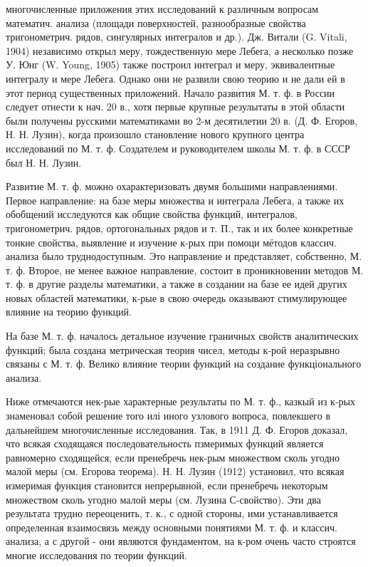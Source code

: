 \documentclass[10pt]{article}
\begin{document}
многочисленные приложения этих исследований к различным вопросам математич. анализа (площади поверхностей, разнообразные свойства тригонометрич. рядов, сингулярных интегралов и др.). Дж. Витали (G. Vitali, 1904) независимо открыл меру, тождественную мере Лебега, а несколько позже У. Юнг (W. Young, 1905) также построил интеграл и меру, эквивалентные интегралу и мере Лебега. Однако они не развили свою теорию и не дали ей в этот период существенных приложений. Начало развития М. т. ф. в России следует отнести к нач. 20 в., хотя первые крупные резулытаты в этой области были получены русскими математиками во 2-м десятилетии 20 в. (Д. Ф. Егоров, Н. Н. Лузин), когда произошло становление нового крупного центра исследований по М. т. ф. Создателем и руководителем школы М. т. ф. в СССР был Н. Н. Лузин.



Развитие М. т. ф. можно охарактеризовать двумя большими направлениями. Первое направление: на базе меры множества и интеграла Лебега, а также их обобщений исследуются как общие свойства функций, интегралов, тригонометрич. рядов, ортогональных рядов и т. П., так и их более конкретные тонкие свойства, выявление и изучение к-рых при помоци мётодов классич. анализа было труднодоступным. Это направление и представляет, собственно, М. т. ф. Второе, не менее важное направление, состоит в проникновении методов М. т. ф. в другие разделы математики, а также в создании на базе ее идей других новых областей математики, к-рые в свою очередь оказывают стимулирующее влияние на теорию функций.



На базе М. т. ф. началось детальное изучение граничных свойств аналитических функций; была создана метрическая теория чисел, методы к-рой неразрывно связаны с М. т. ф. Велико влияние теории функций на создание функціонального анализа.



Ниже отмечаются нек-рые характерные результаты по М. т. ф., казкый из к-рых знаменовал собой решение того илі иного узлового вопроса, повлекшего в дальнейшем многочисленные исследования. Так, в 1911 Д. Ф. Егоров доказал, что всякая сходящаяся последовательность пзмеримых функций является равномерно сходящейся, если пренебречь нек-рым множеством сколь угодно малой меры (см. Егорова теорема). Н. Н. Лузин (1912) установил, что всякая измеримая функция становится непрерывной, если пренебречь некоторым множеством сколь угодно малой меры (см. Лузина С-свойство). Эти два результата трудно переоценить, т. к., с одной стороны, ими устанавливается определенная взаимосвязь между основными понятиями М. т. ф. и классич. анализа, а с другой - они являются фундаментом, на к-ром очень часто строятся многие исследования по теории функций.
\end{document}
